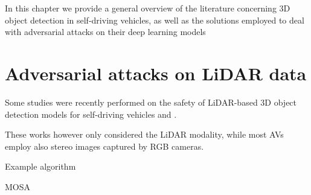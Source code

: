 In this chapter we provide a general overview of the literature concerning 3D object detection in self-driving vehicles, as well as the solutions employed to deal with adversarial attacks on their deep learning models

\section{Adversarial attacks on LiDAR data}
Some studies were recently performed on the safety of LiDAR-based 3D object detection models for self-driving vehicles \cite{DBLP:journals/corr/abs-1907-05418} and \cite{DBLP:conf/cvpr/TuRMLYDCU20}.


These works however only considered the LiDAR modality, while most AVs employ also stereo images captured by RGB cameras.


Example algorithm
\begin{algorithm}[H]
    \caption{MOSA}


    \DontPrintSemicolon   

\end{algorithm}
